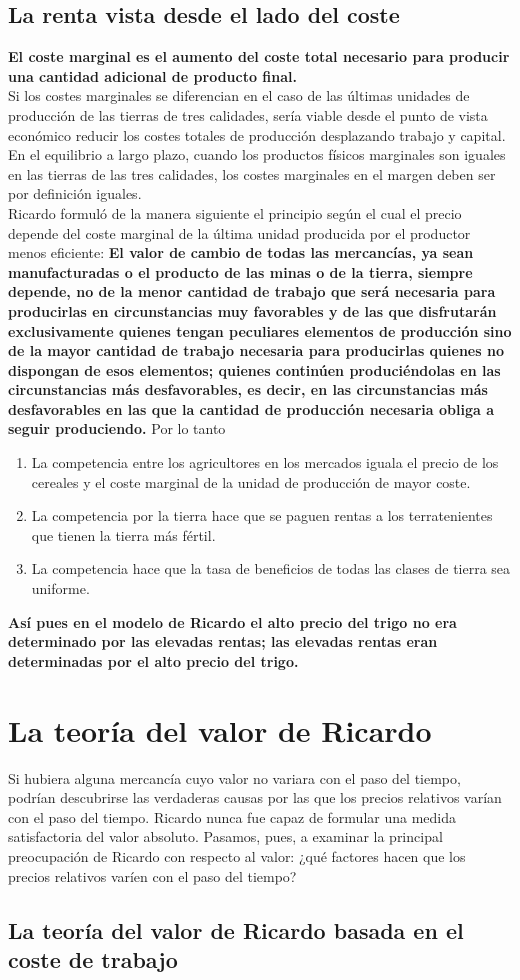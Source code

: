 \documentclass[10pt]{book}
\begin{document}
\subsection*{La renta vista desde el lado del coste}
\textbf{El coste marginal es el aumento del coste total necesario para producir una cantidad adicional de producto final.}\\
Si los costes marginales se diferencian en el caso de las últimas unidades de producción de las tierras de tres calidades, sería viable desde el punto de vista económico reducir los costes totales de producción desplazando trabajo y capital. En el equilibrio a largo plazo, cuando los productos físicos marginales son iguales en las tierras de las tres calidades, los costes marginales en el margen deben ser por definición iguales.\\
Ricardo formuló de la manera siguiente el principio según el cual el precio depende del coste marginal de la última unidad producida por el productor menos eficiente:
\textbf{El valor de cambio de todas las mercancías, ya sean manufacturadas o el producto de las minas o de la tierra, siempre depende, no de la menor cantidad de trabajo que será necesaria para producirlas en circunstancias muy favorables y de las que disfrutarán exclusivamente quienes tengan peculiares elementos de producción sino de la mayor cantidad de trabajo necesaria para producirlas quienes no dispongan de esos elementos; quienes continúen produciéndolas en las circunstancias más desfavorables, es decir, en las circunstancias más desfavorables en las que la cantidad de producción necesaria obliga a seguir produciendo.}
Por lo tanto 
\begin{enumerate}
    \item La competencia entre los agricultores en los mercados iguala el precio de los cereales y el coste marginal de la unidad de producción de mayor coste.
    \item La competencia por la tierra hace que se paguen rentas a los terratenientes que tienen la tierra más fértil.
    \item La competencia hace que la tasa de beneficios de todas las clases de tierra sea uniforme.
\end{enumerate}

\textbf{Así pues en el modelo de Ricardo el alto precio del trigo no era determinado por las elevadas rentas; las elevadas rentas eran determinadas por el alto precio del trigo.}\\

\section*{La teoría del valor de Ricardo}
Si hubiera alguna mercancía cuyo valor no variara con el paso del tiempo, podrían descubrirse las verdaderas causas por las que los precios relativos varían con el paso del tiempo. Ricardo nunca
  fue capaz de formular una medida satisfactoria del valor absoluto. Pasamos, pues, a examinar la principal preocupación de Ricardo con respecto al valor: ¿qué factores hacen que los precios relativos varíen con el paso del tiempo?

\subsection*{La teoría del valor de Ricardo basada en el coste de trabajo}
\end{document}
